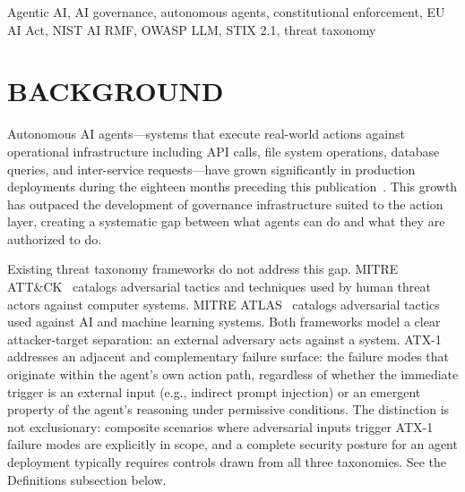 \documentclass{IEEEoj-data}
\newcommand{\replaced}[2]{#1}
\newcommand{\added}[1]{#1}
\begin{document}
\begin{abstract}
{\textcolor{ieeedata}{\abstractheadfont\bfseries{DATA TYPE/LOCATION}}} Threat Taxonomy; Online (IEEE DataPort, Zenodo, aegis-governance.com)
\end{abstract}

\begin{IEEEkeywords}
Agentic AI, AI governance, autonomous agents, constitutional enforcement, EU AI Act, NIST AI RMF, OWASP LLM, STIX 2.1, threat taxonomy
\end{IEEEkeywords}

\maketitle

\section*{BACKGROUND}

Autonomous AI agents---systems that execute real-world actions against operational infrastructure including API calls, file system operations, database queries, and inter-service requests---have grown significantly in production deployments during the \replaced{eighteen}{twelve} months preceding this publication~\cite{ref1}. This growth has outpaced the development of governance infrastructure suited to the action layer, creating a systematic gap between what agents can do and what they are authorized to do.

Existing threat taxonomy frameworks do not address this gap. MITRE ATT\&CK~\cite{ref2} catalogs adversarial tactics and techniques used by human threat actors against computer systems. MITRE ATLAS~\cite{ref3} catalogs adversarial tactics used against AI and machine learning systems. Both frameworks model a clear attacker-target separation: an external adversary acts against a system. ATX-1 \replaced{addresses an adjacent and complementary failure surface: the failure modes that originate within the agent's own action path, regardless of whether the immediate trigger is an external input (e.g., indirect prompt injection) or an emergent property of the agent's reasoning under permissive conditions}{addresses the scenario where the AI agent itself is the threat source---not through compromise or malicious intent, but through capability without governance constraint}. \added{The distinction is not exclusionary: composite scenarios where adversarial inputs trigger ATX-1 failure modes are explicitly in scope, and a complete security posture for an agent deployment typically requires controls drawn from all three taxonomies. See the Definitions subsection below.}
\end{document}
